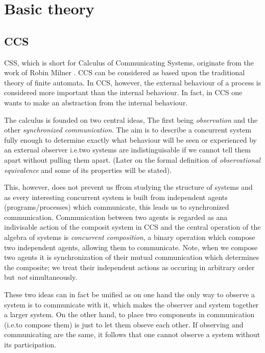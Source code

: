 
\chapter{Basic theory}\label{chapBasic}

\section{CCS}

CSS, which is short for Calculus of Communicating Systems, originate from the work of Robin Milner \cite{Milner}. CCS can be considered as based upon the traditional theory of finite automata. In CCS, however, the external behaviour of a process is considered more important than the internal behaviour. In fact, in CCS one wants to make an abstraction from the internal behaviour.

The calculus is founded on two central ideas, The first being {\it observation\/} and the other {\it synchronized communication}. The aim is to describe a concurrent system fully enough to determine exactly what behaviour will be seen or experienced by an external observer i.e.\@ two systems are indistinguisable if we cannot tell them apart without pulling them apart. (Later on the formal definition of {\it observational equivalence\/} and some of its properties will be stated).

This, however, does not prevent us ffrom studying the structure of systems and as every interesting concurrent system is built from independent agents (programs/processes) which communicate, this leads us to synchronized communication. Communication between two agents is regarded as ana indivisable action of the composit system in CCS and the central operation of the algebra of systems is {\it concurrent composition}, a binary operation which compose two independent agents, allowing them to communicate.
Note, when we compose two agents it is synchronization of their mutual communication which determines the composite; we treat their independent actions as occuring in arbitrary order but {\it not\/} simultaneously.

These two ideas can in fact be unified as on one hand the only way to observe a system is to communicate with it, which makes the observer and system together a larger system. On the other hand, to place two components in communication (i.e.\@ to compose them) is just to let them obseve each other. If observing and communicating are the same, it follows that one cannot observe a system without its participation.

